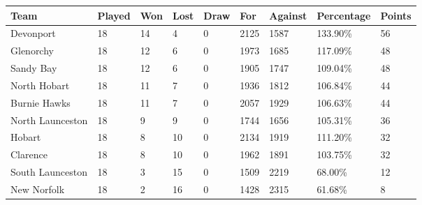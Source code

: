 \documentclass{article}
\begin{document}
\begin{tabular}{lllllllll}
\toprule
Team & Played & Won & Lost & Draw & For & Against & Percentage & Points \\
\midrule
Devonport & 18 & 14 & 4 & 0 & 2125 & 1587 & 133.90\% & 56 \\
Glenorchy & 18 & 12 & 6 & 0 & 1973 & 1685 & 117.09\% & 48 \\
Sandy Bay & 18 & 12 & 6 & 0 & 1905 & 1747 & 109.04\% & 48 \\
North Hobart & 18 & 11 & 7 & 0 & 1936 & 1812 & 106.84\% & 44 \\
Burnie Hawks & 18 & 11 & 7 & 0 & 2057 & 1929 & 106.63\% & 44 \\
North Launceston & 18 & 9 & 9 & 0 & 1744 & 1656 & 105.31\% & 36 \\
Hobart & 18 & 8 & 10 & 0 & 2134 & 1919 & 111.20\% & 32 \\
Clarence & 18 & 8 & 10 & 0 & 1962 & 1891 & 103.75\% & 32 \\
South Launceston & 18 & 3 & 15 & 0 & 1509 & 2219 & 68.00\% & 12 \\
New Norfolk & 18 & 2 & 16 & 0 & 1428 & 2315 & 61.68\% & 8 \\
\bottomrule
\end{tabular}
\end{document}
